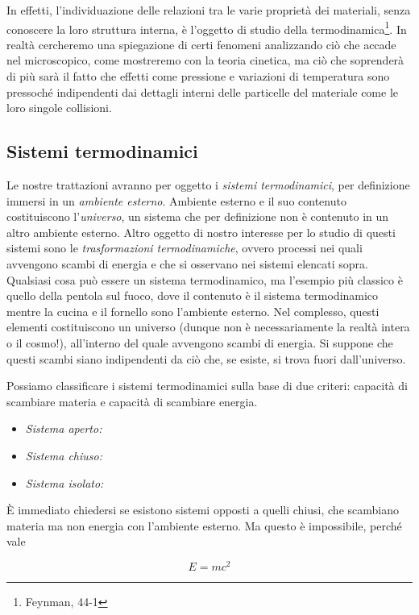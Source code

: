 In effetti, l'individuazione delle relazioni tra le varie proprietà
dei materiali, senza conoscere la loro struttura interna, è l'oggetto
di studio della termodinamica\footnote{Feynman, 44-1}. In realtà cercheremo una spiegazione di certi fenomeni
analizzando ciò che accade nel microscopico, come mostreremo con la
teoria cinetica, ma ciò che soprenderà di più sarà il fatto che effetti
come pressione e variazioni di temperatura sono pressoché indipendenti
dai dettagli interni delle particelle del materiale come le loro singole
collisioni.

\subsection{Sistemi termodinamici}
Le nostre trattazioni avranno per oggetto i \textit{sistemi termodinamici}, per
definizione immersi in un \textit{ambiente esterno}. Ambiente esterno e il suo
contenuto costituiscono l'\textit{universo}, un sistema che per definizione non
è contenuto in un altro ambiente esterno.
Altro oggetto di nostro interesse per lo studio di questi sistemi sono le
\textit{trasformazioni termodinamiche}, ovvero processi nei quali avvengono
scambi di energia e che si osservano nei sistemi elencati sopra. Qualsiasi
cosa può essere un sistema termodinamico, ma l'esempio più classico è quello
della pentola sul fuoco, dove il contenuto è il sistema termodinamico mentre
la cucina e il fornello sono l'ambiente esterno. Nel complesso, questi
elementi costituiscono un universo (dunque non è necessariamente la
realtà intera o il cosmo!), all'interno del quale avvengono scambi di
energia. Si suppone che questi scambi siano indipendenti da ciò che, se esiste,
si trova fuori dall'universo.

Possiamo classificare i sistemi termodinamici sulla base di due criteri: capacità
di scambiare materia e capacità di scambiare energia.

\begin{itemize}
    \item \textit{Sistema aperto:}
    \item \textit{Sistema chiuso:}
    \item \textit{Sistema isolato:}
\end{itemize}

È immediato chiedersi se esistono sistemi opposti a quelli chiusi, che
scambiano materia ma non energia con l'ambiente esterno. Ma questo
è impossibile, perché vale

\[ E = mc^2 \]


